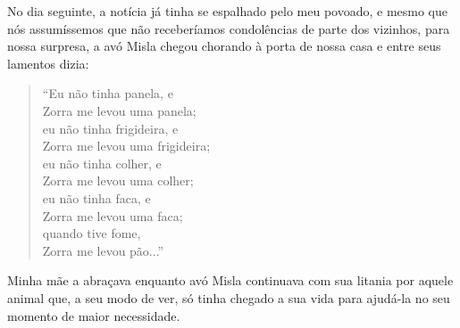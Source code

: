 No dia seguinte, a notícia já tinha se espalhado pelo meu povoado, e mesmo que nós assumíssemos que não receberíamos condolências de parte dos vizinhos, para nossa surpresa, a avó Misla chegou chorando à porta de nossa casa e entre seus lamentos dizia:
\begin{quotation}
\noindent ``Eu não tinha panela, e \\Zorra me levou uma panela;\\ 
eu não tinha frigideira, e \\Zorra me levou uma frigideira;\\ 
eu não tinha colher, e \\Zorra me levou uma colher;\\
eu não tinha faca, e \\Zorra me levou uma faca;\\
quando tive fome, \\Zorra me levou pão...''
\end{quotation}
Minha mãe a abraçava enquanto avó Misla continuava com sua litania por aquele animal que, a seu modo de ver, só tinha chegado a sua vida para ajudá-la no seu momento de maior necessidade.
 

